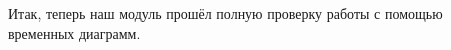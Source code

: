 \documentclass[12pt, a4paper]{article}
\begin{document}
	Итак, теперь наш модуль прошёл полную проверку работы с помощью временных диаграмм. 
	

\end{document}
